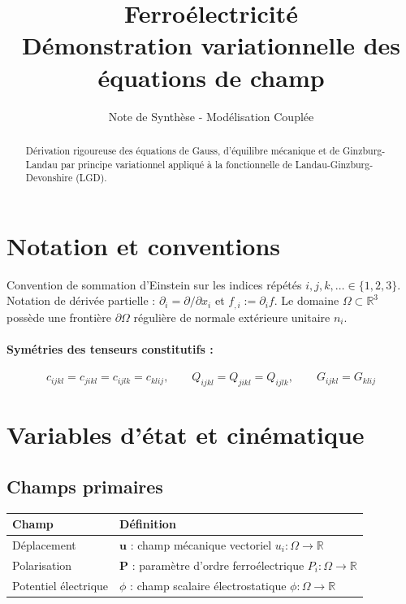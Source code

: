\documentclass[11pt, a4paper]{article}
\title{\textbf{Ferroélectricité \\ Démonstration variationnelle des équations de champ}}
\author{Note de Synthèse - Modélisation Couplée}
\date{}
\begin{document}
\maketitle

\begin{abstract}
Dérivation rigoureuse des équations de Gauss, d'équilibre mécanique et de Ginzburg-Landau par principe variationnel appliqué à la fonctionnelle de Landau-Ginzburg-Devonshire (LGD).
\end{abstract}

\section{Notation et conventions}

Convention de sommation d'Einstein sur les indices répétés $i,j,k,\ldots \in \{1,2,3\}$. Notation de dérivée partielle : $\partial_i = \partial/\partial x_i$ et $f_{,i} := \partial_i f$. Le domaine $\Omega \subset \mathbb{R}^3$ possède une frontière $\partial\Omega$ régulière de normale extérieure unitaire $n_i$.

\paragraph{Symétries des tenseurs constitutifs :}
\begin{equation*}
c_{ijkl} = c_{jikl} = c_{ijlk} = c_{klij}, \qquad Q_{ijkl} = Q_{jikl} = Q_{ijlk}, \qquad G_{ijkl} = G_{klij}
\end{equation*}

\section{Variables d'état et cinématique}

\subsection{Champs primaires}
\begin{table}[h]
\centering
\begin{tabular}{ll}
\toprule
\textbf{Champ} & \textbf{Définition} \\
\midrule
Déplacement & $\mathbf{u}$ : champ mécanique vectoriel $u_i : \Omega \to \mathbb{R}$ \\
Polarisation & $\mathbf{P}$ : paramètre d'ordre ferroélectrique $P_i : \Omega \to \mathbb{R}$ \\
Potentiel électrique & $\phi$ : champ scalaire électrostatique $\phi : \Omega \to \mathbb{R}$ \\
\bottomrule
\end{tabular}
\end{table}
\end{document}
